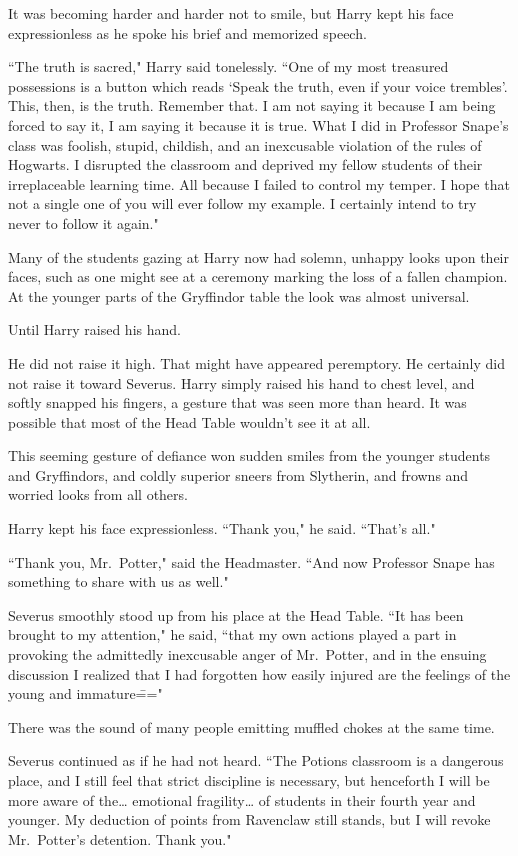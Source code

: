 It was becoming harder and harder not to smile, but Harry kept his face expressionless as he spoke his brief and memorized speech.

``The truth is sacred," Harry said tonelessly. ``One of my most treasured possessions is a button which reads `Speak the truth, even if your voice trembles'. This, then, is the truth. Remember that. I am not saying it because I am being forced to say it, I am saying it because it is true. What I did in Professor Snape's class was foolish, stupid, childish, and an inexcusable violation of the rules of Hogwarts. I disrupted the classroom and deprived my fellow students of their irreplaceable learning time. All because I failed to control my temper. I hope that not a single one of you will ever follow my example. I certainly intend to try never to follow it again."

Many of the students gazing at Harry now had solemn, unhappy looks upon their faces, such as one might see at a ceremony marking the loss of a fallen champion. At the younger parts of the Gryffindor table the look was almost universal.

Until Harry raised his hand.

He did not raise it high. That might have appeared peremptory. He certainly did not raise it toward Severus. Harry simply raised his hand to chest level, and softly snapped his fingers, a gesture that was seen more than heard. It was possible that most of the Head Table wouldn't see it at all.

This seeming gesture of defiance won sudden smiles from the younger students and Gryffindors, and coldly superior sneers from Slytherin, and frowns and worried looks from all others.

Harry kept his face expressionless. ``Thank you," he said. ``That's all."

``Thank you, Mr.~Potter," said the Headmaster. ``And now Professor Snape has something to share with us as well."

Severus smoothly stood up from his place at the Head Table. ``It has been brought to my attention," he said, ``that my own actions played a part in provoking the admittedly inexcusable anger of Mr.~Potter, and in the ensuing discussion I realized that I had forgotten how easily injured are the feelings of the young and immature\==="

There was the sound of many people emitting muffled chokes at the same time.

Severus continued as if he had not heard. ``The Potions classroom is a dangerous place, and I still feel that strict discipline is necessary, but henceforth I will be more aware of the{\ldots} emotional fragility{\ldots} of students in their fourth year and younger. My deduction of points from Ravenclaw still stands, but I will revoke Mr.~Potter's detention. Thank you."

